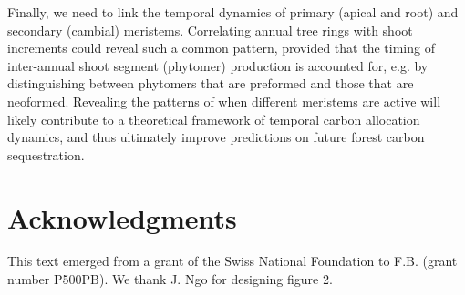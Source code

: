 \documentclass{article}
\begin{document}
Finally, we need to link the temporal dynamics of primary (apical and root) and secondary (cambial) meristems. Correlating annual tree rings with shoot increments could reveal such a common pattern, provided that the timing of inter-annual shoot segment (phytomer) production is accounted for, e.g. by distinguishing between phytomers that are preformed and those that are neoformed. Revealing the patterns of when different meristems are active will likely contribute to a theoretical framework of temporal carbon allocation dynamics, and thus ultimately improve predictions on future forest carbon sequestration.


	


	
\section*{Acknowledgments}
	This text emerged from a grant of the Swiss National Foundation to F.B. (grant number P500PB). We thank J. Ngo for designing figure 2.
	
	
	\pagebreak
	

	\newpage

	
 
	
	
	
	
	
	
	
\end{document}
